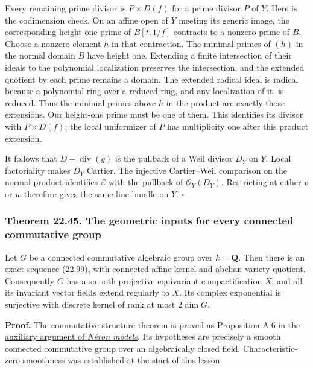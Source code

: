 \documentclass[
  11pt,
  a4paper,
]{article}
\begin{document}
Every remaining prime divisor is \(P\times D(f)\) for a prime divisor
\(P\) of \(Y\). Here is the codimension check. On an affine open of
\(Y\) meeting its generic image, the corresponding height-one prime of
\(B[t,1/f]\) contracts to a nonzero prime of \(B\). Choose a nonzero
element \(h\) in that contraction. The minimal primes of \((h)\) in the
normal domain \(B\) have height one. Extending a finite intersection of
their ideals to the polynomial localization preserves the intersection,
and the extended quotient by each prime remains a domain. The extended
radical ideal is radical because a polynomial ring over a reduced ring,
and any localization of it, is reduced. Thus the minimal primes above
\(h\) in the product are exactly those extensions. Our height-one prime
must be one of them. This identifies its divisor with \(P\times D(f)\);
the local uniformizer of \(P\) has multiplicity one after this product
extension.

It follows that \(D-\operatorname{div}(g)\) is the pullback of a Weil
divisor \(D_Y\) on \(Y\). Local factoriality makes \(D_Y\) Cartier. The
injective Cartier--Weil comparison on the normal product identifies
\(\mathcal E\) with the pullback of \(\mathcal O_Y(D_Y)\). Restricting
at either \(v\) or \(w\) therefore gives the same line bundle on \(Y\).
\(\square\)

\subsubsection{Theorem 22.45. The geometric inputs for every connected
commutative
group}\label{theorem-22.45.-the-geometric-inputs-for-every-connected-commutative-group}

Let \(G\) be a connected commutative algebraic group over
\(k=\overline{\mathbf Q}\). Then there is an exact sequence (22.99),
with connected affine kernel and abelian-variety quotient. Consequently
\(G\) has a smooth projective equivariant compactification \(X\), and
all its invariant vector fields extend regularly to \(X\). Its complex
exponential is surjective with discrete kernel of rank at most
\(2\dim G\).

\textbf{Proof.} The commutative structure theorem is proved as
Proposition A.6 in the
\href{https://kokunoyumeto.github.io/open-math-courses-public/courses/AG-GS/AG-GS-07.html\#auxiliary-argument-the-commutative-structure-used-in-lemma-7-2}{auxiliary
argument of \emph{Néron models}}. Its hypotheses are precisely a smooth
connected commutative group over an algebraically closed field.
Characteristic-zero smoothness was established at the start of this
lesson.
\end{document}
